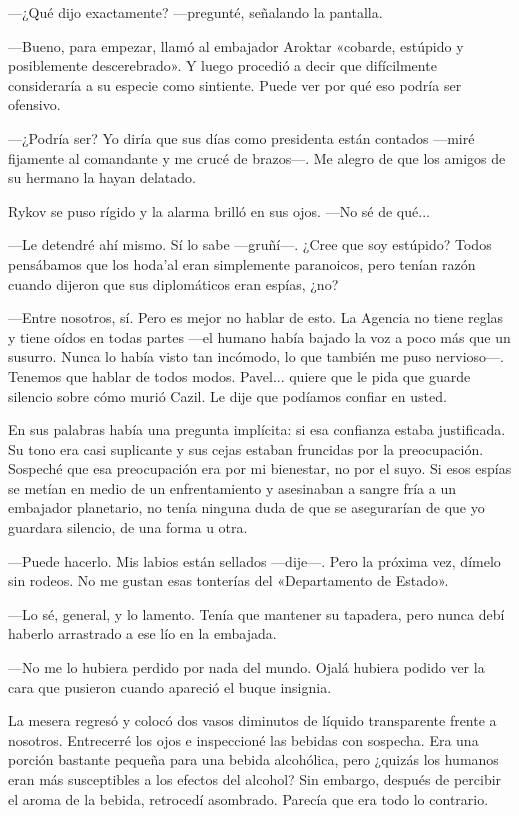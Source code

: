  —¿Qué dijo exactamente? —pregunté, señalando la pantalla.

—Bueno, para empezar, llamó al embajador Aroktar «cobarde, estúpido y posiblemente descerebrado». Y luego procedió a decir que difícilmente consideraría a su especie como sintiente. Puede ver por qué eso podría ser ofensivo.

—¿Podría ser? Yo diría que sus días como presidenta están contados —miré fijamente al comandante y me crucé de brazos—. Me alegro de que los amigos de su hermano la hayan delatado.

Rykov se puso rígido y la alarma brilló en sus ojos. —No sé de qué...

—Le detendré ahí mismo. Sí lo sabe —gruñí—. ¿Cree que soy estúpido? Todos pensábamos que los hoda'al eran simplemente paranoicos, pero tenían razón cuando dijeron que sus diplomáticos eran espías, ¿no?

—Entre nosotros, sí. Pero es mejor no hablar de esto. La Agencia no tiene reglas y tiene oídos en todas partes —el humano había bajado la voz a poco más que un susurro. Nunca lo había visto tan incómodo, lo que también me puso nervioso—. Tenemos que hablar de todos modos. Pavel... quiere que le pida que guarde silencio sobre cómo murió Cazil. Le dije que podíamos confiar en usted.

En sus palabras había una pregunta implícita: si esa confianza estaba justificada. Su tono era casi suplicante y sus cejas estaban fruncidas por la preocupación. Sospeché que esa preocupación era por mi bienestar, no por el suyo. Si esos espías se metían en medio de un enfrentamiento y asesinaban a sangre fría a un embajador planetario, no tenía ninguna duda de que se asegurarían de que yo guardara silencio, de una forma u otra.

—Puede hacerlo. Mis labios están sellados —dije—. Pero la próxima vez, dímelo sin rodeos. No me gustan esas tonterías del «Departamento de Estado».

—Lo sé, general, y lo lamento. Tenía que mantener su tapadera, pero nunca debí haberlo arrastrado a ese lío en la embajada.

—No me lo hubiera perdido por nada del mundo. Ojalá hubiera podido ver la cara que pusieron cuando apareció el buque insignia.

La mesera regresó y colocó dos vasos diminutos de líquido transparente frente a nosotros. Entrecerré los ojos e inspeccioné las bebidas con sospecha. Era una porción bastante pequeña para una bebida alcohólica, pero ¿quizás los humanos eran más susceptibles a los efectos del alcohol? Sin embargo, después de percibir el aroma de la bebida, retrocedí asombrado. Parecía que era todo lo contrario.

